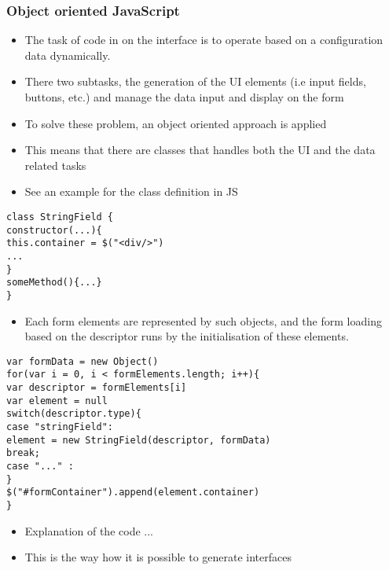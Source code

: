 \subsubsection{Object oriented JavaScript}

\begin{itemize}
	\item The task of code in on the interface is to operate based on a configuration data dynamically.
	\item There two subtasks, the generation of the UI elements (i.e input fields, buttons, etc.) and manage the data input and display on the form
	\item To solve these problem, an object oriented approach is applied
	\item This means that there are classes that handles both the UI and the data related tasks
	\item See an example for the class definition in JS
\end{itemize}


\begin{lstlisting}[basicstyle=\footnotesize, frame=single, caption={JavaScript class}, captionpos=b]
class StringField {
constructor(...){
this.container = $("<div/>")
...
}
someMethod(){...}			
}
\end{lstlisting}

\begin{itemize}
	\item Each form elements are represented by such objects, and the form loading based on the descriptor runs by the initialisation of these elements.  
\end{itemize}

\begin{lstlisting}[basicstyle=\footnotesize, frame=single, caption={Form generation based on configuration data}, captionpos=b]
var formData = new Object()
for(var i = 0, i < formElements.length; i++){
var descriptor = formElements[i]
var element = null
switch(descriptor.type){
case "stringField":
element = new StringField(descriptor, formData)
break;
case "..." : 
}
$("#formContainer").append(element.container)
}	
\end{lstlisting}



\begin{itemize}
	\item Explanation of the code ...
	\item This is the way how it is possible to generate interfaces
\end{itemize}



